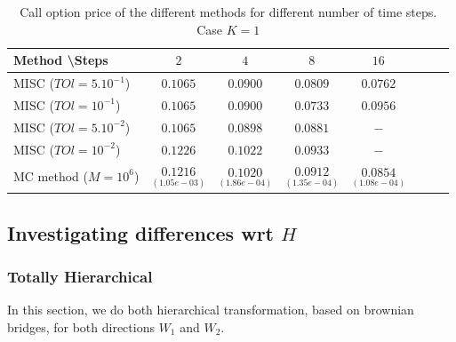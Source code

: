 \documentclass[11pt]{article}
\begin{document}
\begin{table}[h!]
	\centering
	\begin{tabular}{l*{6}{c}r}
		Method \textbackslash  Steps            & $2$ & $4$ & $8$ & $16$  \\
		\hline
		MISC ($TOl=5.10^{-1}$)  & $0.1065$ & $0.0900$ & $0.0809$ & $0.0762$  \\
		MISC ($TOl=10^{-1}$)  &  $0.1065$ &   $0.0900$ & $0.0733$ & $0.0956$  \\
		MISC ($TOl=5.10^{-2}$)        &  $0.1065$ &$0.0898$ &  $0.0881$ &  $-$ \\
		MISC ($TOl=10^{-2}$)    & $0.1226$ & $0.1022$  & $0.0933$ & $-$  \\
		MC method ($M=10^{6}$)   & $\underset{(1.05e-03)}{0.1216} $  & $\underset{(1.86e-04)}{0.1020} $  & $\underset{ (1.35e-04)}{0.0912}$ & $\underset {(1.08e-04)}{0.0854} $  \\		
		\hline
	\end{tabular}
	\caption{ Call option price of the different methods for different number of time steps. Case $K=1$}
	\label{table: Call option price of the different methods for different number of time steps. Case $K=1$_H_007}
\end{table}



\newpage
\subsection{Investigating  differences wrt $H$ }\label{sec:mixed differences rbergomi_wrt_H}

\subsubsection{Totally Hierarchical}
In this section, we do both hierarchical transformation, based on brownian bridges, for both directions $W_1$ and $W_2$.
\end{document}
